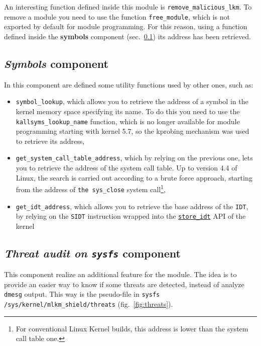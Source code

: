 \documentclass{article}
\begin{document}
	An interesting function defined inside this module is \texttt{remove\_malicious\_lkm}. To remove a module you need
	to use the function \texttt{free\_module}, which is not exported by default for module programming. For this
	reason, using a function defined inside the \textbf{symbols} component (sec.~\ref{sec:symbols}) its address has
	been retrieved.

	\subsection{\emph{Symbols} component}\label{sec:symbols}
	In this component are defined some utility functions used by other ones, such as:
	\begin{itemize}
		\item \texttt{symbol\_lookup}, which allows you to retrieve the address of a symbol in the kernel memory space
		specifying its name. To do this you need to use the \texttt{kallsyms\_lookup\_name} function, which is no
		longer available for module programming starting with kernel 5.7, so the kprobing mechanism was used to
		retrieve its address,
		\item \texttt{get\_system\_call\_table\_address}, which by relying on the previous one, lets you to retrieve
		the address of the system call table. Up to version 4.4 of Linux, the search is carried out according to a
		brute force approach, starting from the address of \texttt{the sys\_close} system call\footnote{For
			conventional Linux Kernel builds, this address is lower than the system call table one.},
		\item \texttt{get\_idt\_address}, which allows you to retrieve the base address of the \texttt{IDT}, by relying
		on the \texttt{SIDT} instruction wrapped into the
		\href{https://elixir.bootlin.com/linux/latest/source/arch/x86/include/asm/desc.h#L223}{\texttt{store\_idt}} API
		of the kernel
	\end{itemize}

	\subsection{\emph{Threat audit on \texttt{sysfs}} component}\label{sec:threats}
	This component realize an additional feature for the module. The idea is to provide an easier way to know if some
	threats are detected, instead of analyze \texttt{dmesg} output. This way is the pseudo-file in \texttt{sysfs}
	\texttt{/sys/kernel/mlkm\_shield/threats} (fig.~\ref{fig:threats}).
\end{document}
